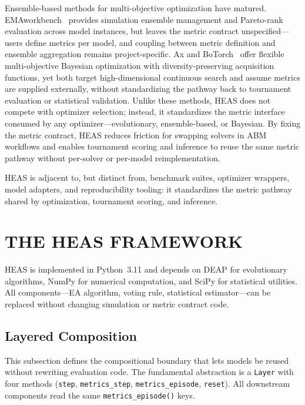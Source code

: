 \documentclass{wscpaperproc}
\begin{document}
Ensemble-based methods for multi-objective optimization have matured.
EMAworkbench~\cite{kwakkel2017workbench} provides simulation ensemble
management and Pareto-rank evaluation across model instances, but leaves the
metric contract unspecified---users define metrics per model, and coupling
between metric definition and ensemble aggregation remains project-specific.
Ax and BoTorch~\cite{bakshy2018ae} offer flexible multi-objective Bayesian
optimization with diversity-preserving acquisition functions, yet both target
high-dimensional continuous search and assume metrics are supplied externally,
without standardizing the pathway back to tournament evaluation or statistical
validation. Unlike these methods, HEAS does not compete with optimizer
selection; instead, it standardizes the metric interface consumed by any
optimizer---evolutionary, ensemble-based, or Bayesian. By fixing the metric
contract, HEAS reduces friction for swapping solvers in ABM workflows and
enables tournament scoring and inference to reuse the same metric pathway
without per-solver or per-model reimplementation.

HEAS is adjacent to, but distinct from, benchmark suites, optimizer wrappers,
model adapters, and reproducibility tooling: it standardizes the metric pathway
shared by optimization, tournament scoring, and inference.

\section{THE HEAS FRAMEWORK}

HEAS is implemented in Python~3.11 and depends on DEAP for evolutionary
algorithms, NumPy for numerical computation, and SciPy for statistical
utilities. All components---EA algorithm, voting rule, statistical
estimator---can be replaced without changing simulation or metric contract code.

\subsection{Layered Composition}

This subsection defines the compositional boundary that lets models be reused
without rewriting evaluation code. The fundamental abstraction is a
\texttt{Layer} with four methods
(\texttt{step}, \texttt{metrics\_step}, \texttt{metrics\_episode},
\texttt{reset}). All downstream components read the same
\texttt{metrics\_episode()} keys.
\end{document}

